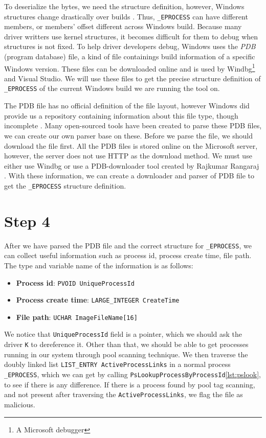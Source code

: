 To deserialize the bytes, we need the structure definition, however, Windows structures change drastically over builds \cite{windowsKernelCharacterization}. Thus, \texttt{\_EPROCESS} can have different members, or members' offset different across Windows build. Because many driver writters use kernel structures, it becomes difficult for them to debug when structures is not fixed. To help driver developers debug, Windows uses the \textit{PDB} (program database) file, a kind of file containings build information of a specific Windows version. These files can be downloaded online and is used by Windbg\footnote{A Microsoft debugger} and Visual Studio. We will use these files to get the precise structure definition of \texttt{\_EPROCESS} of the current Windows build we are running the tool on.

The PDB file has no official definition of the file layout, however Windows did provide us a repository containing information about this file type, though incomplete \cite{microsoft-pdb}. Many open-sourced tools have been created to parse these PDB files, we can create our own parser base on these. Before we parse the file, we should download the file first. All the PDB files is stored online on the Microsoft server, however, the server does not use HTTP as the download method. We must use either use Windbg or use a PDB-downloader tool created by Rajkumar Rangaraj \cite{pdb-downloader}. With these information, we can create a downloader and parser of PDB file to get the \texttt{\_EPROCESS} structure definition.

\section[Step 4]{Step 4}

After we have parsed the PDB file and the correct structure for \texttt{\_EPROCESS}, we can collect useful information such as process id, process create time, file path. The type and variable name of the information is as follows:

\begin{itemize}
  \item \textbf{Process id}: \texttt{PVOID UniqueProcessId}
  \item \textbf{Process create time}: \texttt{LARGE\_INTEGER CreateTime}
  \item \textbf{File path}: \texttt{UCHAR ImageFileName[16]}
\end{itemize}

We notice that \texttt{UniqueProcessId} field is a pointer, which we should ask the driver \texttt{K} to dereference it. Other than that, we should be able to get processes running in our system through pool scanning technique. We then traverse the doubly linked list \texttt{LIST\_ENTRY ActiveProcessLinks} in a normal process \texttt{\_EPROCESS}, which we can get by calling \texttt{PsLookupProcessByProcessId}\ref{lst:pslook}, to see if there is any difference. If there is a process found by pool tag scanning, and not present after traversing the \texttt{ActiveProcessLinks}, we flag the file as malicious.

